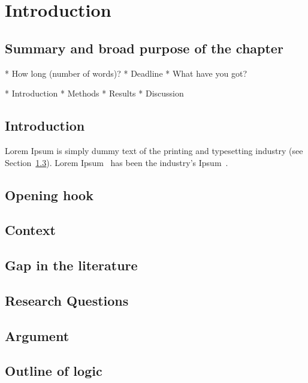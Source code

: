 
\chapter{Introduction}  %

\ifpdf
    \graphicspath{{chapter1/figs/raster/}{chapter1/figs/PDF/}{chapter1/figs/}}
\else
    \graphicspath{{chapter1/figs/vector/}{chapter1/figs/}}
\fi

\section*{Summary and broad purpose of the chapter}
* How long (number of words)?
* Deadline
* What have you got?

* Introduction
* Methods
* Results
* Discussion


\section[Short title]{Introduction}


Lorem Ipsum is simply dummy text of the printing and typesetting industry (see
Section~\ref{section1.1}). Lorem Ipsum~\citep{Aup91} has been the industry's
Ipsum~\citep{AAB95,Con90,LM65}.



\lipsum[1-4]



\section{Opening hook}

\section{Context} %
\label{section1.1}

\section{Gap in the literature}
\section{Research Questions}
\section{Argument}

\section{Outline of logic}
